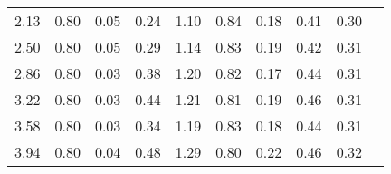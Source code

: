 \begin{tabular}{rrrrrrrrrr}
 2.13 &     0.80 &     0.05  &     0.24 &      1.10 &      0.84 &      0.18 &      0.41 &      0.30 \\ 
 2.50 &     0.80 &     0.05  &     0.29 &      1.14 &      0.83 &      0.19 &      0.42 &      0.31 \\ 
 2.86 &     0.80 &     0.03  &     0.38 &      1.20 &      0.82 &      0.17 &      0.44 &      0.31 \\ 
 3.22 &     0.80 &     0.03  &     0.44 &      1.21 &      0.81 &      0.19 &      0.46 &      0.31 \\ 
 3.58 &     0.80 &     0.03  &     0.34 &      1.19 &      0.83 &      0.18 &      0.44 &      0.31 \\ 
 3.94 &     0.80 &     0.04  &     0.48 &      1.29 &      0.80 &      0.22 &      0.46 &      0.32 \\ \hline 
\end{tabular}
